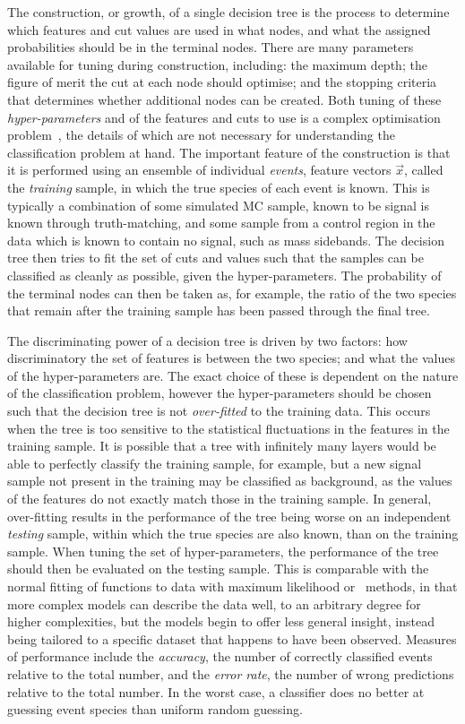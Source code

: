 The construction, or growth, of a single decision tree is the process to 
determine which features and cut values are used in what nodes, and what the 
assigned probabilities should be in the terminal nodes.
There are many parameters available for tuning during construction, including: 
the maximum depth; the figure of merit the cut at each node should optimise; 
and the stopping criteria that determines whether additional nodes can be 
created.
Both tuning of these \emph{hyper-parameters} and of the features and cuts to 
use is a complex optimisation problem~\cite{Louppe:14077502}, the details of 
which are not necessary for understanding the classification problem at hand.
The important feature of the construction is that it is performed using an 
ensemble of individual \emph{events}, feature vectors $\vec{x}$, called the 
\emph{training} sample, in which the true species of each event is known.
This is typically a combination of some simulated \ac{MC} sample, known to be 
signal is known through truth-matching, and some sample from a control region 
in the data which is known to contain no signal, such as mass sidebands.
The decision tree then tries to fit the set of cuts and values such that the 
samples can be classified as cleanly as possible, given the hyper-parameters.
The probability of the terminal nodes can then be taken as, for example, the 
ratio of the two species that remain after the training sample has been passed 
through the final tree.

The discriminating power of a decision tree is driven by two factors: how 
discriminatory the set of features is between the two species; and what the 
values of the hyper-parameters are.
The exact choice of these is dependent on the nature of the classification 
problem, however the hyper-parameters should be chosen such that the decision 
tree is not \emph{over-fitted} to the training data.
This occurs when the tree is too sensitive to the statistical fluctuations in 
the features in the training sample.
It is possible that a tree with infinitely many layers would be able to 
perfectly classify the training sample, for example, but a new signal sample 
not present in the training may be classified as background, as the values of 
the features do not exactly match those in the training sample.
In general, over-fitting results in the performance of the tree being worse on 
an independent \emph{testing} sample, within which the true species are also 
known, than on the training sample.
When tuning the set of hyper-parameters, the performance of the tree should 
then be evaluated on the testing sample.
This is comparable with the normal fitting of functions to data with maximum 
likelihood or \chisq\ methods, in that more complex models can describe the 
data well, to an arbitrary degree for higher complexities, but the models begin 
to offer less general insight, instead being tailored to a specific dataset 
that happens to have been observed.
Measures of performance include the \emph{accuracy}, the number of correctly 
classified events relative to the total number, and the \emph{error rate}, the 
number of wrong predictions relative to the total number.
In the worst case, a classifier does no better at guessing event species than 
uniform random guessing.

